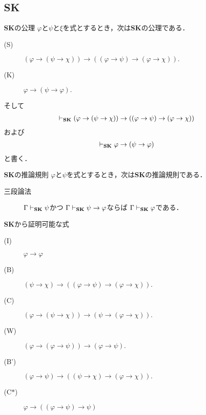 \subsection{{\bf SK}}
	\begin{itembox}[l]{{\bf SK}の公理}
		$\varphi$と$\psi$と$\xi$を式とするとき，次は{\bf SK}の公理である．
		\begin{description}
			\item[(S)] $(\varphi \rightarrow (\psi \rightarrow \chi)) 
				\rightarrow ((\varphi \rightarrow \psi)
				\rightarrow (\varphi \rightarrow \chi)).$
			
			\item[(K)] $\varphi \rightarrow (\psi \rightarrow \varphi).$
		\end{description}
	\end{itembox}
	
	そして
	\begin{align}
		\vdash_{{\scriptsize \mbox{{\bf SK}}}} (\varphi \rightarrow (\psi \rightarrow \chi)) 
			\rightarrow ((\varphi \rightarrow \psi)
			\rightarrow (\varphi \rightarrow \chi))
	\end{align}
	および
	\begin{align}
		\vdash_{{\scriptsize \mbox{{\bf SK}}}} \varphi \rightarrow (\psi \rightarrow \varphi)
	\end{align}
	と書く．
	
	\begin{itembox}[l]{{\bf SK}の推論規則}
		$\varphi$と$\psi$を式とするとき，次は{\bf SK}の推論規則である．
		\begin{description}
			\item[三段論法] $\Gamma \vdash_{{\scriptsize \mbox{{\bf SK}}}} \psi$かつ
				$\Gamma \vdash_{{\scriptsize \mbox{{\bf SK}}}} \psi \rightarrow \varphi$ならば
				$\Gamma \vdash_{{\scriptsize \mbox{{\bf SK}}}} \varphi$である．
		\end{description}
	\end{itembox}
	
	{\bf SK}から証明可能な式
	\begin{description}
		\item[(I)] $\varphi \rightarrow \varphi$
		\item[(B)] $(\psi \rightarrow \chi) \rightarrow ((\varphi \rightarrow \psi) \rightarrow (\varphi \rightarrow \chi)).$
		\item[(C)] $(\varphi \rightarrow (\psi \rightarrow \chi)) \rightarrow (\psi \rightarrow (\varphi \rightarrow \chi)).$
		\item[(W)] $(\varphi \rightarrow (\varphi \rightarrow \psi)) \rightarrow (\varphi \rightarrow \psi).$
		\item[(B')] $(\varphi \rightarrow \psi) \rightarrow ((\psi \rightarrow \chi) \rightarrow (\varphi \rightarrow \chi)).$
		\item[(C$\ast$)] $\varphi \rightarrow ((\varphi \rightarrow \psi) \rightarrow \psi)$
	\end{description}
	
